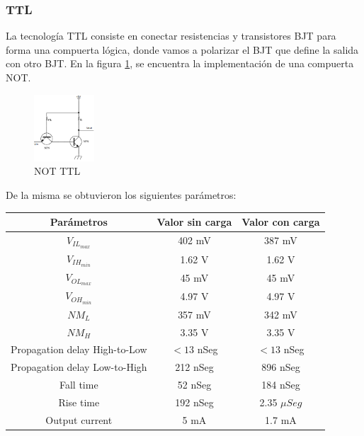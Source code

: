 \subsubsection{TTL}
La tecnología TTL consiste en conectar resistencias y transistores BJT para forma una compuerta lógica, donde vamos a polarizar el BJT que define la salida con otro BJT. En la figura \ref{fig:eje1_2}, se encuentra la implementación de una compuerta NOT.
\begin{figure}[H]
	\centering
	\includegraphics[width=0.2\textwidth]{Ejercicio1/TTL.png}
	\caption{NOT TTL}
	\label{fig:eje1_2}
\end{figure}
De la misma se obtuvieron los siguientes parámetros:
\begin{table}[H]
	\centering
	\begin{tabular}{|c|c|c|}
		\hline
		Parámetros & Valor sin carga & Valor con carga\\
		\hline
		$V_{IL_{max}}$ & 402 mV & 387 mV\\
		\hline
		$V_{IH_{min}}$ & 1.62 V & 1.62 V\\
		\hline
		$V_{OL_{max}}$ & 45 mV & 45 mV\\
		\hline
		$V_{OH_{min}}$ & 4.97 V & 4.97 V\\
		\hline
		$NM_{L}$ & 357 mV & 342 mV\\
		\hline
		$NM_{H}$ & 3.35 V & 3.35 V\\
		\hline
		Propagation delay High-to-Low & $<13$ nSeg & $<13$ nSeg\\
		\hline
		Propagation delay Low-to-High & 212 nSeg & 896 nSeg\\
		\hline
		Fall time & 52 nSeg & 184 nSeg\\
		\hline
		Rise time & 192 nSeg & 2.35 $\mu Seg$\\
		\hline
		Output current & 5 mA & 1.7 mA\\
		\hline
	\end{tabular}
\end{table}

